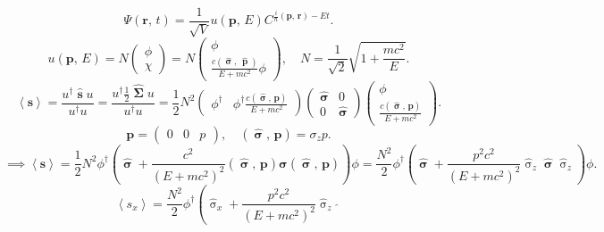 \documentclass[a4paper]{article}
\begin{document}
\begin{sol}
\[
	\Psi\left( \mathbf{r},\,t \right) = \frac{1}{\sqrt{V} }
	u \left( \mathbf{p},\, E \right) C^{\frac{i}{\hbar }\left( 
	\mathbf{p},\,\mathbf{r}\right) -Et}
.\] 
\[
	u(\mathbf{p},\,E)= N \begin{pmatrix} \phi\\\chi \end{pmatrix} =N \begin{pmatrix} \phi\\
\frac{c\left( \widehat{\operatorname{\boldsymbol{\sigma}}},\,
\widehat{\operatorname{\mathbf{p}}}\right) }{E+mc^2}\phi\end{pmatrix} , \quad N= \frac{1}{\sqrt{2} }\sqrt{ 1+ \frac{mc^2}{E}} 
.\] 
\[
	\left<\mathbf{s} \right> = \frac{u^\dagger \widehat{\operatorname{
	\mathbf{s}}}u}{u^\dagger u}=
	\frac{u^\dagger \frac{1}{2} \widehat{\operatorname{\boldsymbol{\Sigma}}}u}{u^\dagger u}=
	\frac{1}{2} N^2 \begin{pmatrix} 
		\phi^\dagger & \phi^\dagger \frac{c \left( \widehat{\operatorname{\boldsymbol{\sigma}}},\,\mathbf{p} \right) }{E+mc^2}\end{pmatrix} \begin{pmatrix} \widehat{\operatorname{\boldsymbol{\sigma}}}&0\\ 0&
	\widehat{\operatorname{\boldsymbol{\sigma}}}\end{pmatrix} 
	\begin{pmatrix} \phi\\ \frac{c \left( \widehat{\operatorname{\boldsymbol{\sigma}}},\,\mathbf{p} \right) }{E+mc^2} \end{pmatrix} 
.\] 
\[
	\mathbf{p}= \begin{pmatrix} 0 & 0 & p \end{pmatrix} ,\quad
	\left( \widehat{\operatorname{\boldsymbol{\sigma}}},\,\mathbf{p} \right) =\sigma_zp
.\] 
\[
	\implies \left<\mathbf{s} \right> =  \frac{1}{2}
	N^2 \phi^\dagger \left( \widehat{\operatorname{\boldsymbol{\sigma}}}+ \frac{c^2}{(E+mc^2)^2} \left( \widehat{\operatorname{\boldsymbol{\sigma}}},\, \mathbf{p} \right) \boldsymbol{\sigma}
	\left( \widehat{\operatorname{\boldsymbol{\sigma}}},\,
\mathbf{p}\right) \right) \phi=
\frac{N^2}{2} \phi^\dagger \left(  \widehat{\operatorname{\boldsymbol{\sigma}}}+ \frac{p^2c^2}{(E+mc^2)^2}\widehat{\operatorname{\sigma}}_z
\widehat{\operatorname{\boldsymbol{\sigma}}} \widehat{\operatorname{\sigma}}_z\right) \phi
.\] 
\[
	\left<s_x \right> = \frac{N^2}{2} \phi^\dagger \left( 
	\widehat{\operatorname{\sigma}}_x + \frac{p^2 c^2}{
(E+mc^2)^2}\widehat{\operatorname{\sigma}}_z \widehat{\operatorname{
}}\]
\end{sol}
\end{document}
